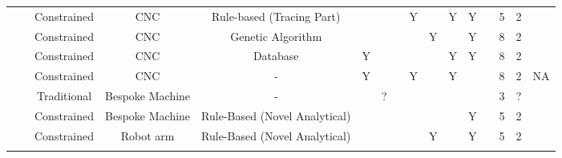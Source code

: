 \begin{tabular}{lccccccccccccccc}
 & \citep{Tanaka2005DevelopmentWorking,Asakawa2010DevelopmentProcess,Takasugi2012DevelopmentShape}                 & Constrained & CNC             & Rule-based (Tracing Part)         &             &            &           & Y         &               & Y          & Y            &           & 5   & 2           &          \\
 & \citep{Mori1996DeterminationAlgorithm}                                                                          & Constrained & CNC             & Genetic Algorithm                 &             &            &           &           & Y             &            & Y            &           & 8   & 2           &          \\
 & \citep{Mori1998IncrementalDatabase}                                                                             & Constrained & CNC             & Database                          & Y           &            &           &           &               & Y          & Y            &           & 8   & 2           &          \\
 & \citep{Tanaka2014DevelopmentHammering}                                                                          & Constrained & CNC             & -                                 & Y           &            &           & Y         &               & Y          &              &           & 8   & 2           & NA       \\
 & \citep{Sharon2014FraunhoferReport}                                                                              & Traditional & Bespoke Machine & -                                 &             & ?          &           &           &               &            &              &           & 3   & ?           &          \\
 & \citep{Wang2017IncrementalPath,Zhu2019ToolForming,Schafer2005IncrementalRobots,Puzik2008IncrementalApplication} & Constrained & Bespoke Machine & Rule-Based (Novel Analytical)     &             &            &           &           &               &            & Y            &           & 5   & 2           &          \\
 & \citep{Luo2010ASimulation}                                                                                      & Constrained & Robot arm       & Rule-Based (Novel Analytical)     &             &            &           &           & Y             &            & Y            &           & 5   & 2           &          \\
 &                                                                                                                 &             &                 &                                   &             &            &           &           &               &            &              &           &     &             &          \\

\end{tabular}

